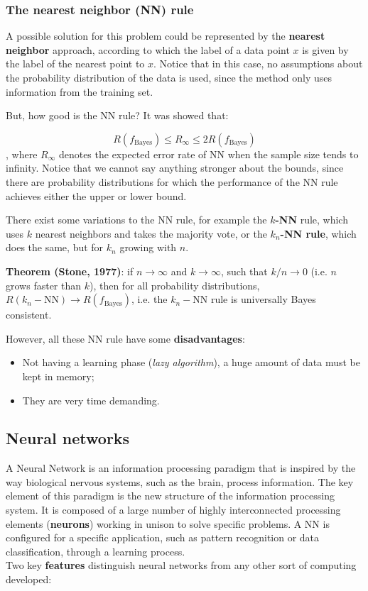 \subsubsection{The nearest neighbor (NN) rule} A possible solution for this problem could be represented by the \textbf{nearest neighbor} approach, according to which the label of a data point $x$ is given by the label of the nearest point to $x$. Notice that in this case, no assumptions about the probability distribution of the data is used, since the method only uses information from the training set.

But, how good is the NN rule? It was showed that:

$$
R(f_{\text{Bayes}}) \leq R_{\infty} \leq 2R(f_{\text{Bayes}})
$$
, where $R_{\infty}$ denotes the expected error rate of NN when the sample size tends to infinity. Notice that we cannot say anything stronger about the bounds, since there are probability distributions for which the performance of the NN rule achieves either the upper or lower bound.

There exist some variations to the NN rule, for example the \textbf{$k$-NN} rule, which uses $k$ nearest neighbors and takes the majority vote, or the \textbf{$k_n$-NN rule}, which does the same, but for $k_n$ growing with $n$.

\textbf{Theorem (Stone, 1977)}: if $n \to \infty$ and $k \to \infty$, such that $k/n \to 0$ (i.e. $n$ grows faster than $k$), then for all probability distributions, $R(k_n - \text{NN}) \to R(f_\text{Bayes})$, i.e. the $k_n - \text{NN}$ rule is universally Bayes consistent.

However, all these NN rule have some \textbf{disadvantages}:

\begin{itemize}
    \item Not having a learning phase (\textit{lazy algorithm}), a huge amount of data must be kept in memory;
    \item They are very time demanding.
\end{itemize}

\subsection{Neural networks}
A Neural Network is an information processing paradigm that is inspired by the way biological nervous systems, such as the brain, process information. The key element of this paradigm is the new structure of the information processing system. It is composed of a large number of highly interconnected processing elements (\textbf{neurons}) working in unison to solve specific problems. A NN is configured for a specific application, such as pattern recognition or data classification, through a learning process.\\
Two key \textbf{features} distinguish neural networks from any other sort of computing developed:

